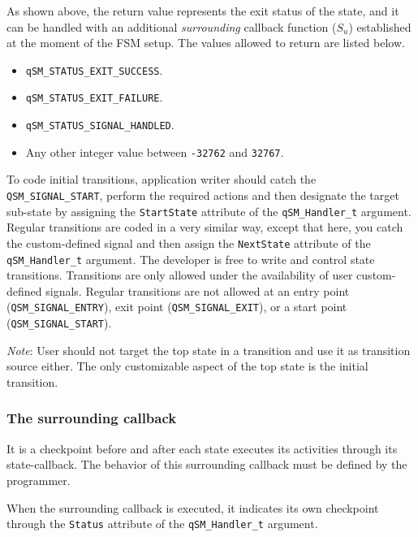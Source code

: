 As shown above, the return value represents the exit status of the state, and it can be handled with an additional \textit{surrounding} callback function ($S_u$) established at the moment of the FSM setup. The values allowed to return are listed below.

\begin{itemize}
    \item \lstinline{qSM_STATUS_EXIT_SUCCESS}.
    \item \lstinline{qSM_STATUS_EXIT_FAILURE}.
    \item \lstinline{qSM_STATUS_SIGNAL_HANDLED}.
    \item Any other integer value between \lstinline{-32762} and \lstinline{32767}.
\end{itemize} 


To code initial transitions, application writer should catch the \lstinline{QSM_SIGNAL_START}, perform the required actions and then designate the target sub-state by assigning the \lstinline{StartState} attribute of the \lstinline{qSM_Handler_t} argument.
Regular transitions are coded in a very similar way, except that here, you catch the custom-defined signal and then assign the \lstinline{NextState} attribute of the \lstinline{qSM_Handler_t} argument.
The developer is free to write and control state transitions. Transitions are only allowed under the availability of user custom-defined signals. Regular transitions are not allowed at an entry point (\lstinline{QSM_SIGNAL_ENTRY}), exit point (\lstinline{QSM_SIGNAL_EXIT}), or a start point (\lstinline{QSM_SIGNAL_START}).

\begin{tcolorbox}
\ArrowBoldDownRight \textit{Note}: User should not target the top state in a transition and use it as transition source either. The only customizable aspect of the top state is the initial transition.
\end{tcolorbox}

\subsubsection{The surrounding callback}
It is a checkpoint before and after each state executes its activities through its state-callback. The behavior of this surrounding callback must be defined by the programmer.



When the surrounding callback is executed, it indicates its own checkpoint through the \lstinline{Status} attribute of the \lstinline{qSM_Handler_t} argument.

